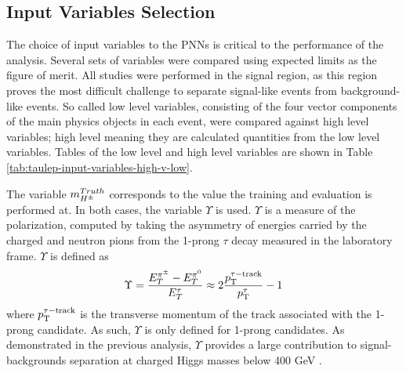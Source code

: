 		\subsection{Input Variables Selection}\label{ssec:input-variables}
			The choice of input variables to the PNNs is critical to the performance of the analysis. Several sets of variables were compared using expected limits as the figure of merit. All studies were performed in the \taulep signal region, as this region proves the most difficult challenge to separate signal-like events from background-like events. So called low level variables, consisting of the four vector components of the main physics objects in each event, were compared against high level variables; high level meaning they are calculated quantities from the low level variables. Tables of the low level and high level variables are shown in Table \ref{tab:taulep-input-variables-high-v-low}. 

			The variable $m_{H^{\pm}}^{Truth}$ corresponds to the \mHpm value the training and evaluation is performed at. In both cases, the variable $\Upsilon$ is used. $\Upsilon$ is a measure of the \tauhad polarization, computed by taking the asymmetry of energies carried by the charged and neutron pions from the 1-prong $\tau$ decay measured in the laboratory frame. $\Upsilon$ is defined as
			\begin{equation}\label{eqn:upsilon}
			\Upsilon = \frac{ E^{\pi^{\pm}}_{T} - E^{\pi^{0}}_{T}}{E^{\tau}_{T}} \approx 2 \frac{p_{\text{T}}^{\tau-\mathrm{track}}}{p_{\text{T}}^{\tau}} -1
			\end{equation}
			where $p_{\text{T}}^{\tau-\mathrm{track}}$ is the transverse momentum of the track associated with the 1-prong \tauhad candidate. As such, $\Upsilon$ is only defined for 1-prong \tauhad candidates. As demonstrated in the previous analysis, $\Upsilon$ provides a large contribution to signal-backgrounds separation at charged Higgs masses below 400 GeV \cite{hpm-previous}.

